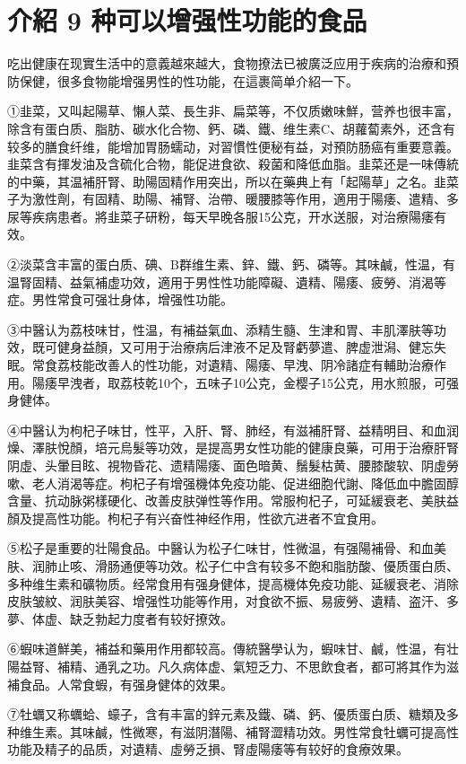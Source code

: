 \documentclass[12pt,UTF8]{ctexbook}
\begin{document}
\section{介紹 9 种可以增强性功能的食品}

吃出健康在现實生活中的意義越來越大，食物撩法已被廣泛应用于疾病的治療和預防保健，很多食物能增强男性的性功能，在這裹简单介紹一下。

①韭菜，又叫起陽草、懶人菜、長生非、扁菜等，不仅质嫩味鮮，营养也很丰富，除含有蛋白质、脂肪、碳水化合物、鈣、磷、鐵、维生素C、胡蘿蔔素外，还含有较多的膳食纤维，能增加胃肠蠕动，对習慣性便秘有益，对預防肠癌有重要意義。韭菜含有揮发油及含硫化合物，能促进食欲、殺菌和降低血脂。韭菜还是一味傳統的中藥，其温補肝腎、助陽固精作用突出，所以在藥典上有「起陽草」之名。韭菜子为激性劑，有固精、助陽、補腎、治帶、暖腰膝等作用，適用于陽痿、遣精、多尿等疾病患者。將韭菜子研粉，每天早晚各服15公克，开水送服，对治療陽痿有效。

②淡菜含丰富的蛋白质、碘、B群维生素、鋅、鐵、鈣、磷等。其味鹹，性温，有温腎固精、益氣補虚功效，適用于男性性功能障礙、遺精、陽痿、疲勞、消渴等症。男性常食可强壮身体，增强性功能。

③中醫认为荔枝味甘，性温，有補益氣血、添精生髓、生津和胃、丰肌澤肤等功效，既可健身益顏，又可用于治療病后津液不足及腎虧夢遣、脾虚泄潟、健忘失眠。常食荔枝能改善人的性功能，对遺精、陽痿、早洩、阴冷諸症有輔助治療作用。陽痿早洩者，取荔枝乾10个，五味子10公克，金樱子15公克，用水煎服，可强身健体。

④中醫认为枸杞子味甘，性平，入肝、腎、肺经，有滋補肝腎、益精明目、和血润燥、澤肤悅顏，培元烏髮等功效，是提高男女性功能的健康良藥，可用于治療肝腎阴虛、头暈目眩、視物昏花、遗精陽痿、面色暗黄、鬚髮枯黄、腰膝酸软、阴虛勞嗽、老人消渴等症。枸杞子有增强機体免疫功能、促进细胞代謝、降低血中膽固醇含量、抗动脉粥樣硬化、改善皮肤弹性等作用。常服枸杞子，可延緩衰老、美肤益顏及提高性功能。枸杞子有兴奋性神经作用，性欲亢进者不宜食用。

⑤松子是重要的壮陽食品。中醫认为松子仁味甘，性微温，有强陽補骨、和血美肤、润肺止咳、滑肠通便等功效。松子仁中含有较多不飽和脂肪酸、優质蛋白质、多种维生素和礦物质。经常食用有强身健体，提高機体免疫功能、延緩衰老、消除皮肤皱紋、润肤美容、增强性功能等作用，对食欲不振、易疲勞、遺精、盗汗、多夢、体虚、缺乏勃起力度者有较好撩效。

⑥蝦味道鮮美，補益和藥用作用都较高。傳統醫學认为，蝦味甘、鹹，性温，有壮陽益腎、補精、通乳之功。凡久病体虚、氣短乏力、不思飲食者，都可將其作为滋補食品。人常食蝦，有强身健体的效果。

⑦牡蠣又称蠣蛤、蠔子，含有丰富的鋅元素及鐵、磷、鈣、優质蛋白质、糖類及多种维生素。其味鹹，性微寒，有滋阴潛陽、補腎澀精功效。男性常食牡蠣可提高性功能及精子的品质，对遺精、虛勞乏損、腎虛陽痿等有较好的食療效果。
\end{document}

